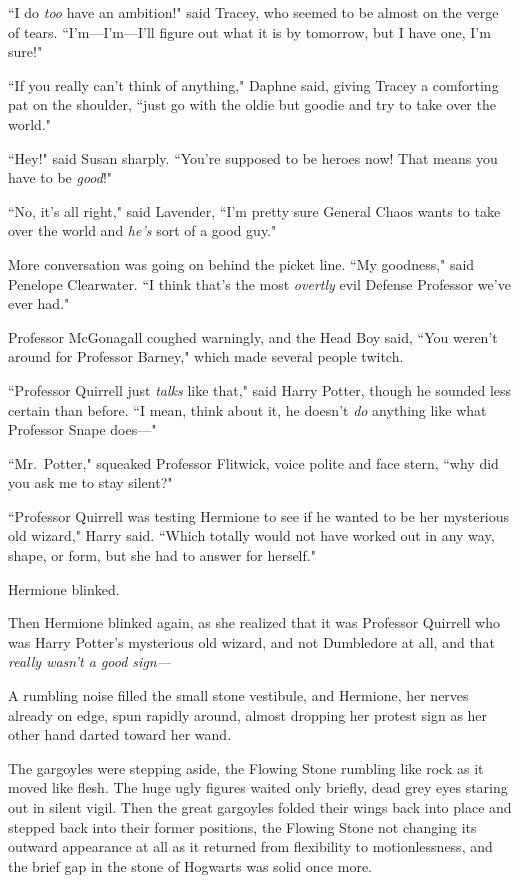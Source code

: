 ``I do \emph{too} have an ambition!" said Tracey, who seemed to be almost on the verge of tears. ``I'm---I'm---I'll figure out what it is by tomorrow, but I have one, I'm sure!"

``If you really can't think of anything," Daphne said, giving Tracey a comforting pat on the shoulder, ``just go with the oldie but goodie and try to take over the world."

``Hey!" said Susan sharply. ``You're supposed to be heroes now! That means you have to be \emph{good}!"

``No, it's all right," said Lavender, ``I'm pretty sure General Chaos wants to take over the world and \emph{he's} sort of a good guy."

More conversation was going on behind the picket line. ``My goodness," said Penelope Clearwater. ``I think that's the most \emph{overtly} evil Defense Professor we've ever had."

Professor McGonagall coughed warningly, and the Head Boy said, ``You weren't around for Professor Barney," which made several people twitch.

``Professor Quirrell just \emph{talks} like that," said Harry Potter, though he sounded less certain than before. ``I mean, think about it, he doesn't \emph{do} anything like what Professor Snape does---"

``Mr.~Potter," squeaked Professor Flitwick, voice polite and face stern, ``why did you ask me to stay silent?"

``Professor Quirrell was testing Hermione to see if he wanted to be her mysterious old wizard," Harry said. ``Which totally would not have worked out in any way, shape, or form, but she had to answer for herself."

Hermione blinked.

Then Hermione blinked again, as she realized that it was Professor Quirrell who was Harry Potter's mysterious old wizard, and not Dumbledore at all, and that \emph{really wasn't a good sign---}

A rumbling noise filled the small stone vestibule, and Hermione, her nerves already on edge, spun rapidly around, almost dropping her protest sign as her other hand darted toward her wand.

The gargoyles were stepping aside, the Flowing Stone rumbling like rock as it moved like flesh. The huge ugly figures waited only briefly, dead grey eyes staring out in silent vigil. Then the great gargoyles folded their wings back into place and stepped back into their former positions, the Flowing Stone not changing its outward appearance at all as it returned from flexibility to motionlessness, and the brief gap in the stone of Hogwarts was solid once more.

